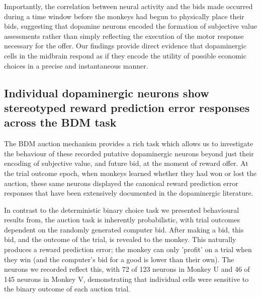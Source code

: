 Importantly, the correlation between neural activity and the bids made occurred during a time window before the monkeys had begun to physically place their bids, suggesting that dopamine neurons encoded the formation of subjective value assessments rather than simply reflecting the execution of the motor response necessary for the offer. Our findings provide direct evidence that dopaminergic cells in the midbrain respond as if they encode the utility of possible economic choices in a precise and instantaneous manner.

\subsection{Individual dopaminergic neurons show stereotyped reward prediction error responses across the BDM task}\label{subsec:stereotyped_rpe}

The BDM auction mechanism provides a rich task which allows us to investigate the behaviour of these recorded putative dopaminergic neurons beyond just their encoding of subjective value, and future bid, at the moment of reward offer. At the trial outcome epoch, when monkeys learned whether they had won or lost the auction, these same neurons displayed the canonical reward prediction error responses that have been extensively documented in the dopaminergic literature.

In contrast to the deterministic binary choice task we presented behavioural results from, the auction task is inherently probabilistic, with trial outcomes dependent on the randomly generated computer bid. After making a bid, this bid, and the outcome of the trial, is revealed to the monkey. This naturally produces a reward prediction error; the monkey can only 'profit' on a trial when they win (and the computer's bid for a good is lower than their own). The neurons we recorded reflect this, with 72 of 123 neurons in Monkey U and 46 of 145 neurons in Monkey V, demonstrating that individual cells were sensitive to the binary outcome of each auction trial.

